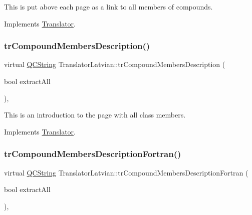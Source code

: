This is put above each page as a link to all members of compounds. 

Implements \mbox{\hyperlink{class_translator}{Translator}}.

\mbox{\label{class_translator_latvian_aaf247a8f1280242ec8af70da0b28b81f}} 
\subsubsection{\texorpdfstring{trCompoundMembersDescription()}{trCompoundMembersDescription()}}
{\footnotesize\ttfamily virtual \mbox{\hyperlink{class_q_c_string}{Q\+C\+String}} Translator\+Latvian\+::tr\+Compound\+Members\+Description (\begin{DoxyParamCaption}\item[{bool}]{extract\+All }\end{DoxyParamCaption})\hspace{0.3cm}{\ttfamily [inline]}, {\ttfamily [virtual]}}

This is an introduction to the page with all class members. 

Implements \mbox{\hyperlink{class_translator}{Translator}}.

\mbox{\label{class_translator_latvian_af48ca81a520d1330103a9684f5e90b4c}} 
\subsubsection{\texorpdfstring{trCompoundMembersDescriptionFortran()}{trCompoundMembersDescriptionFortran()}}
{\footnotesize\ttfamily virtual \mbox{\hyperlink{class_q_c_string}{Q\+C\+String}} Translator\+Latvian\+::tr\+Compound\+Members\+Description\+Fortran (\begin{DoxyParamCaption}\item[{bool}]{extract\+All }\end{DoxyParamCaption})\hspace{0.3cm}{\ttfamily [inline]}, {\ttfamily [virtual]}}

